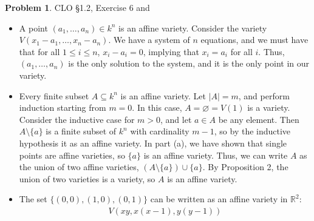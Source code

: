\documentclass[12pt]{amsart}
\newcommand{\R}{\mathbb{R}}
\theoremstyle{definition}
\newtheorem{prob}{Problem}
\begin{document}
\begin{flushleft}
\begin{prob} CLO \S1.2, Exercise 6 and 
\begin{itemize}
\item[a.] A point $(a_1,\dots,a_n) \in k^n$ is an affine variety. Consider the variety $V(x_1 - a_1, \dots, x_n - a_n)$. We have a system of $n$ equations, and we must have that for all $1 \le i \le n$, $x_i - a_i = 0$, implying that $x_i = a_i$ for all $i$. Thus, $(a_1,\dots,a_n)$ is the only solution to the system, and it is the only point in our variety.
\item[b.] Every finite subset $A \subseteq k^n$ is an affine variety. Let $|A|=m$, and perform induction starting from $m=0$. In this case, $A=\varnothing=V(1)$ is a variety. Consider the inductive case for $m>0$, and let $a \in A$ be any element. Then $A \setminus \{a\}$ is a finite subset of $k^n$ with cardinality $m-1$, so by the inductive hypothesis it as an affine variety. In part (a), we have shown that single points are affine varieties, so $\{a\}$ is an affine variety. Thus, we can write $A$ as the union of two affine varieties, $(A\setminus \{a\})\cup \{a\}$. By Proposition 2, the union of two varieties is a variety, so $A$ is an affine variety.
\item[c.] The set $\{(0,0), (1,0), (0,1)\}$ can be written as an affine variety in $\R^2$:
\begin{align*}
    V(xy, x(x-1),y(y-1))
\end{align*}
\end{itemize}
\end{prob}
\end{flushleft}
\end{document}
